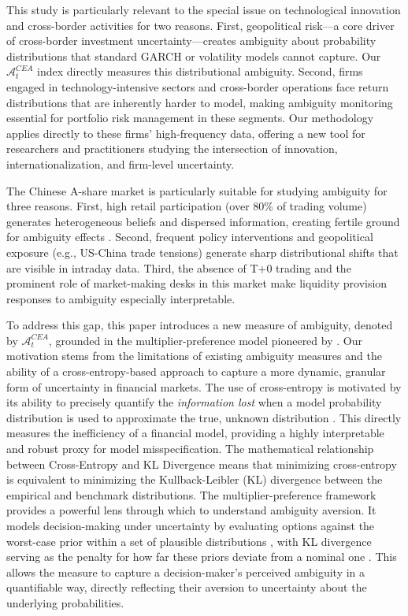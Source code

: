 \documentclass[preprint,12pt,authoryear]{elsarticle}
\renewcommand{\textcolor}[2]{\begingroup\color{#1}#2\endgroup}
\begin{document}
\par

\textcolor{red}{This study is particularly relevant to the special issue on technological innovation and cross-border activities for two reasons. First, geopolitical risk---a core driver of cross-border investment uncertainty---creates ambiguity about probability distributions that standard GARCH or volatility models cannot capture. Our $\mathcal{A}^{CEA}_t$ index directly measures this distributional ambiguity. Second, firms engaged in technology-intensive sectors and cross-border operations face return distributions that are inherently harder to model, making ambiguity monitoring essential for portfolio risk management in these segments. Our methodology applies directly to these firms' high-frequency data, offering a new tool for researchers and practitioners studying the intersection of innovation, internationalization, and firm-level uncertainty.}

\par

\textcolor{red}{The Chinese A-share market is particularly suitable for studying ambiguity for three reasons. First, high retail participation (over 80\% of trading volume) generates heterogeneous beliefs and dispersed information, creating fertile ground for ambiguity effects \citep{guo2020retail}. Second, frequent policy interventions and geopolitical exposure (e.g., US-China trade tensions) generate sharp distributional shifts that are visible in intraday data. Third, the absence of T+0 trading and the prominent role of market-making desks in this market make liquidity provision responses to ambiguity especially interpretable.}

To address this gap, this paper introduces a new measure of ambiguity, denoted by $\mathcal{A}^{CEA}_t$, grounded in the multiplier-preference model pioneered by \cite{hansen2001}. Our motivation stems from the limitations of existing ambiguity measures and the ability of a cross-entropy-based approach to capture a more dynamic, granular form of uncertainty in financial markets. The use of cross-entropy is motivated by its ability to precisely quantify the \textit{information lost} when a model probability distribution is used to approximate the true, unknown distribution \cite{klibanoff2005}. This directly measures the inefficiency of a financial model, providing a highly interpretable and robust proxy for model misspecification. The mathematical relationship between Cross-Entropy and KL Divergence \cite{mackay2003information} means that minimizing cross-entropy is equivalent to minimizing the Kullback-Leibler (KL) divergence between the empirical and benchmark distributions. The multiplier-preference framework \cite{epstein2008} provides a powerful lens through which to understand ambiguity aversion. It models decision-making under uncertainty by evaluating options against the worst-case prior within a set of plausible distributions \cite{maccheroni2006}, with KL divergence serving as the penalty for how far these priors deviate from a nominal one \cite{epstein2008}. This allows the measure to capture a decision-maker's perceived ambiguity in a quantifiable way, directly reflecting their aversion to uncertainty about the underlying probabilities.
\end{document}
